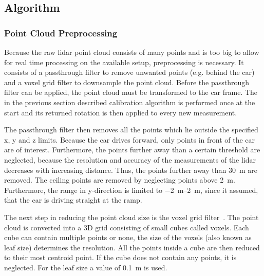 \subsection{Algorithm}
\label{ssec:algorithm_lidar}
\subsubsection{Point Cloud Preprocessing}
Because the raw \gls{lidar} point cloud consists of many points and is too big to allow for real time processing on the available setup, preprocessing is necessary.
It consists of a passthrough filter to remove unwanted points (e.g. behind the car) and a voxel grid filter to downsample the point cloud.
Before the passthrough filter can be applied, the point cloud must be transformed to the car frame.
The in the previous section described calibration algorithm is performed once at the start and its returned rotation is then applied to every new measurement.

The passthrough filter then removes all the points which lie outside the specified x, y and z limits.
Because the car drives forward, only points in front of the car are of interest.
Furthermore, the points further away than a certain threshold are neglected, because the resolution and accuracy of the measurements of the \gls{lidar} decreases with increasing distance.
Thus, the points further away than \SI{30}{\metre} are removed.
The ceiling points are removed by neglecting points above \SI{2}{\metre}.
Furthermore, the range in y-direction is limited to \SIrange{-2}{2}{\metre}, since it assumed, that the car is driving straight at the ramp.

The next step in reducing the point cloud size is the voxel grid filter~\cite{Vosselman2004}.
The point cloud is converted into a 3D grid consisting of small cubes called voxels.
Each cube can contain multiple points or none, the size of the voxels (also known as leaf size) determines the resolution.
All the points inside a cube are then reduced to their most centroid point.
If the cube does not contain any points, it is neglected.
For the leaf size a value of \SI{0.1}{\metre} is used.

